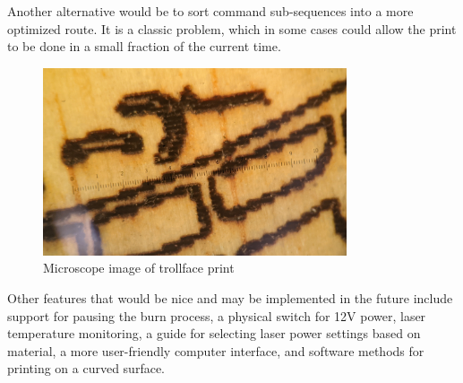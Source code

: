 \documentclass[11pt]{LaTeX-Classes/math-hw}
\begin{document}
Another alternative would be to sort command sub-sequences into a more optimized
route. It is a classic  problem, which in some cases
could allow the print to be done in a small fraction of the current time.

\begin{figure}[H]
  \begin{center}
    \includegraphics[width=0.8\textwidth]{burn-zoomed}
    \caption{Microscope image of trollface print}
    \label{fig:burn-zoomed}
  \end{center}
\end{figure}

Other features that would be nice and may be implemented in the future include
support for pausing the burn process,
a physical switch for 12V power,
laser temperature monitoring,
a guide for selecting laser power settings based on material,
a more user-friendly computer interface,
and software methods for printing on a curved surface.
\end{document}
